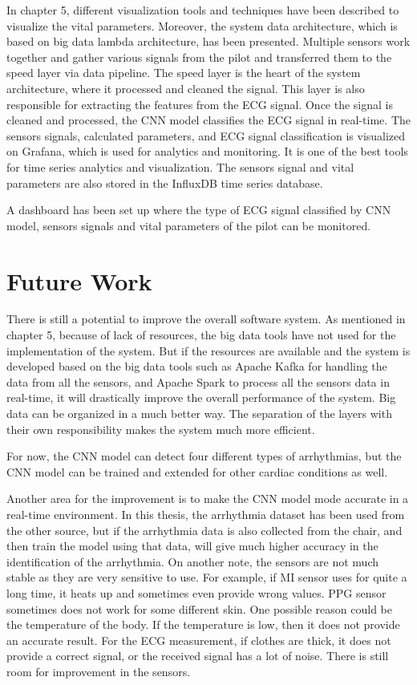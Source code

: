 In chapter 5, different visualization tools and techniques have been described to visualize the vital parameters. Moreover, the system data architecture, which is based on big data lambda architecture, has been presented. Multiple sensors work together and gather various signals from the pilot and transferred them to the speed layer via data pipeline. The speed layer is the heart of the system architecture, where it processed and cleaned the signal. This layer is also responsible for extracting the features from the ECG signal. Once the signal is cleaned and processed, the CNN model classifies the ECG signal in real-time. The sensors signals, calculated parameters, and ECG signal classification is visualized on Grafana, which is used for analytics and monitoring. It is one of the best tools for time series analytics and visualization. The sensors signal and vital parameters are also stored in the InfluxDB time series database. 

A dashboard has been set up where the type of ECG signal classified by CNN model, sensors signals and vital parameters of the pilot can be monitored. 


\section{Future Work}

There is still a potential to improve the overall software system. As mentioned in chapter 5, because of lack of resources, the big data tools have not used for the implementation of the system. But if the resources are available and the system is developed based on the big data tools such as Apache Kafka for handling the data from all the sensors, and Apache Spark to process all the sensors data in real-time, it will drastically improve the overall performance of the system. Big data can be organized in a much better way. The separation of the layers with their own responsibility makes the system much more efficient.

For now, the CNN model can detect four different types of arrhythmias, but the CNN model can be trained and extended for other cardiac conditions as well.

Another area for the improvement is to make the CNN model mode accurate in a real-time environment. In this thesis, the arrhythmia dataset has been used from the other source, but if the arrhythmia data is also collected from the chair, and then train the model using that data, will give much higher accuracy in the identification of the arrhythmia.
On another note, the sensors are not much stable as they are very sensitive to use. For example, if MI sensor uses for quite a long time, it heats up and sometimes even provide wrong values. PPG sensor sometimes does not work for some different skin. One possible reason could be the temperature of the body. If the temperature is low, then it does not provide an accurate result. For the ECG measurement, if clothes are thick, it does not provide a correct signal, or the received signal has a lot of noise. There is still room for improvement in the sensors.
